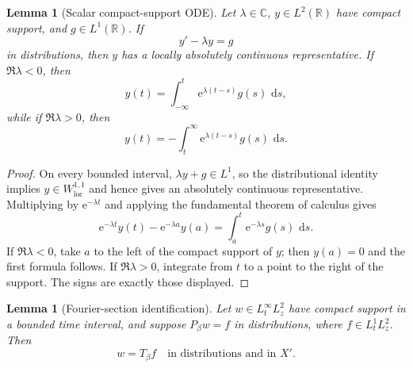 \documentclass[11pt,oneside]{book}
\newtheorem{lemma}[theorem]{Lemma}
\theoremstyle{definition}
\theoremstyle{remark}
\newcommand{\R}{\mathbb R}
\newcommand{\C}{\mathbb C}
\newcommand{\1}{\mathbf 1}
\newcommand{\loc}{\mathrm{loc}}
\newcommand{\dd}{\,\mathrm d}
\newcommand{\e}{\mathrm e}
\begin{document}
\begin{lemma}[Scalar compact-support ODE]
\label{lem:compact-support-ODE}
Let $\lambda\in\C$, $y\in L^2(\R)$ have compact support, and
$g\in L^1(\R)$.  If
\[
 y'-\lambda y=g
\]
in distributions, then $y$ has a locally absolutely continuous
representative.  If $\Re\lambda<0$, then
\[
 y(t)=\int_{-\infty}^t\e^{\lambda(t-s)}g(s)\,\dd s,
\]
while if $\Re\lambda>0$, then
\[
 y(t)=-\int_t^\infty\e^{\lambda(t-s)}g(s)\,\dd s.
\]
\end{lemma}

\begin{proof}
On every bounded interval, $\lambda y+g\in L^1$, so the distributional
identity implies $y\in W^{1,1}_{\loc}$ and hence gives an absolutely
continuous representative.  Multiplying by $\e^{-\lambda t}$ and applying
the fundamental theorem of calculus gives
\[
 \e^{-\lambda t}y(t)-\e^{-\lambda a}y(a)
 =\int_a^t\e^{-\lambda s}g(s)\,\dd s.
\]
If $\Re\lambda<0$, take $a$ to the left of the compact support of $y$; then
$y(a)=0$ and the first formula follows.  If $\Re\lambda>0$, integrate from
$t$ to a point to the right of the support.  The signs are exactly those
displayed.
\end{proof}

\begin{lemma}[Fourier-section identification]
\label{lem:fourier-section-identification}
Let $w\in L^\infty_tL^2_z$ have compact support in a bounded time interval,
and suppose
$P_\beta w=f$ in distributions, where
$f\in L^1_tL^2_z$.  Then
\begin{equation}
 w=T_\beta f\quad\text{in distributions and in }X'. \label{eq:section-Tbeta}
\end{equation}
\end{lemma}
\end{document}
